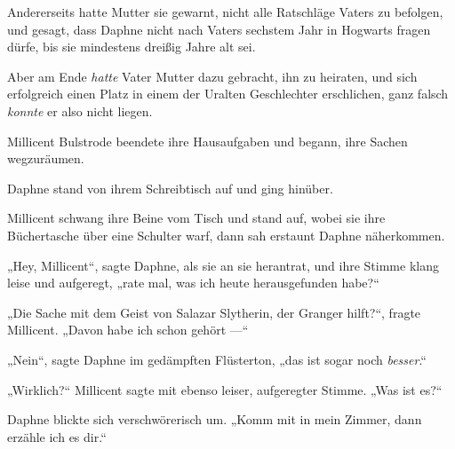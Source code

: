 Andererseits hatte Mutter sie gewarnt, nicht alle Ratschläge Vaters zu befolgen, und gesagt, dass Daphne nicht nach Vaters sechstem Jahr in Hogwarts fragen dürfe, bis sie mindestens dreißig Jahre alt sei.

Aber am Ende \emph{hatte} Vater Mutter dazu gebracht, ihn zu heiraten, und sich erfolgreich einen Platz in einem der Uralten Geschlechter erschlichen, ganz falsch \emph{konnte} er also nicht liegen.

Millicent Bulstrode beendete ihre Hausaufgaben und begann, ihre Sachen wegzuräumen.

Daphne stand von ihrem Schreibtisch auf und ging hinüber.

Millicent schwang ihre Beine vom Tisch und stand auf, wobei sie ihre Büchertasche über eine Schulter warf, dann sah erstaunt Daphne näherkommen.

„Hey, Millicent“, sagte Daphne, als sie an sie herantrat, und ihre Stimme klang leise und aufgeregt, „rate mal, was ich heute herausgefunden habe?“

„Die Sache mit dem Geist von Salazar Slytherin, der Granger hilft?“, fragte Millicent.
„Davon habe ich schon gehört —“

„Nein“, sagte Daphne im gedämpften Flüsterton, „das ist sogar noch \emph{besser}.“

„Wirklich?“ Millicent sagte mit ebenso leiser, aufgeregter Stimme.
„Was ist es?“

Daphne blickte sich verschwörerisch um.
„Komm mit in mein Zimmer, dann erzähle ich es dir.“


